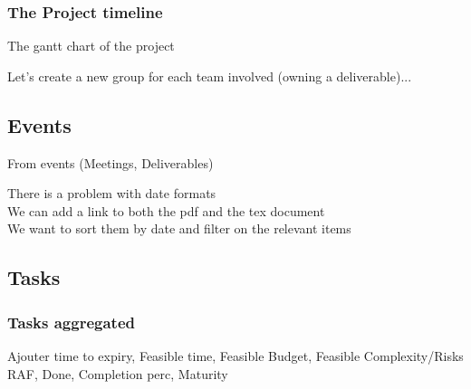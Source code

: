 \documentclass[8pt]{article} %
\begin{document}
\clearpage
\subsubsection{The Project timeline}
The gantt chart of the project\\
\begin{center}

\end{center}

Let's create a new group for each team involved (owning a deliverable)...\\

\subsection{Events}
From events (Meetings, Deliverables)


There is a problem with date formats\\
We can add a link to both the pdf and the tex document\\
We want to sort them by date and filter on the relevant items\\


\subsection{Tasks}
\subsubsection{Tasks aggregated}
Ajouter time to expiry, Feasible time, Feasible Budget, Feasible Complexity/Risks
RAF, Done, Completion perc, Maturity\\





\end{document}
